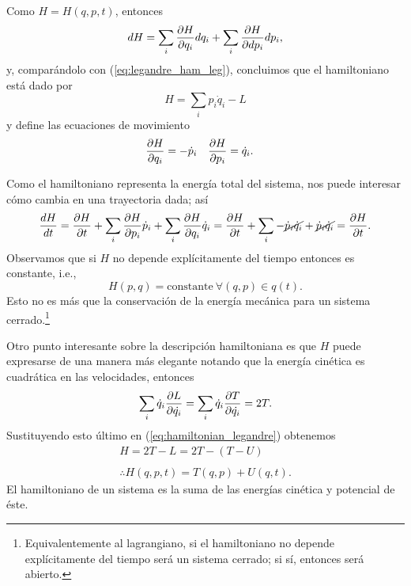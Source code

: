 Como $H = H(q,p,t)$, entonces 
\begin{equation}
 dH = \sum_i \frac{\partial H}{\partial q_i} dq_i + \sum_i \frac{\partial H}{\partial dp_i} dp_i,
 \label{eq:hamilton_differential}
\end{equation}
y, comparándolo con (\ref{eq:legandre_ham_leg}), concluimos que el hamiltoniano está dado por
\begin{equation}
 H = \sum_i p_i \dot{q}_i - L
 \label{eq:hamiltonian_legandre}
\end{equation}
y define las ecuaciones de movimiento
\begin{align}
 &\frac{\partial H}{\partial q_i} = - \dot{p}_i && \frac{\partial H}{\partial p_i} = \dot{q}_i.
\end{align}

Como el hamiltoniano representa la energía total del sistema, nos puede interesar cómo cambia en una trayectoria dada; así 
\begin{equation*}
 \frac{dH}{dt} = \frac{\partial H}{\partial t} + \sum_i \frac{\partial H}{\partial p_i}\dot{p}_i + \sum_i \frac{\partial H}{\partial q_i}\dot{q}_i = \frac{\partial H}{\partial t} + \sum_i - \cancel{\dot{p}_i\dot{q}_i} + \cancel{\dot{p}_i\dot{q}_i} = \frac{\partial H}{\partial t}.
\end{equation*}
Observamos que si $H$ no depende explícitamente del tiempo entonces es constante, i.e.,
\begin{equation*}
 H(p,q) = \text{constante} \ \forall (q,p) \in q(t).
\end{equation*} Esto no es más que la conservación de la energía mecánica para un sistema cerrado.\footnote{Equivalentemente al lagrangiano, si el hamiltoniano no depende explícitamente del tiempo será un sistema cerrado; si sí, entonces será abierto.}

Otro punto interesante sobre la descripción hamiltoniana es que $H$ puede expresarse de una manera más elegante notando que la energía cinética es cuadrática en las velocidades, entonces
\begin{align*}
 \sum_i \dot{q}_i \frac{\partial L}{\partial \dot{q_i}} = \sum_i \dot{q}_i \frac{\partial T}{\partial \dot{q_i}} = 2 T.
\end{align*}
Sustituyendo esto último en (\ref{eq:hamiltonian_legandre}) obtenemos
\begin{align}
 H = 2T - L = 2T - \left( T - U \right) \nonumber \\ 
 \nonumber \\
 \therefore H(q,p,t) = T(q,p) + U(q,t).
 \label{eq:hamiltonian}
\end{align}
El hamiltoniano de un sistema es la suma de las energías cinética y potencial de éste. 